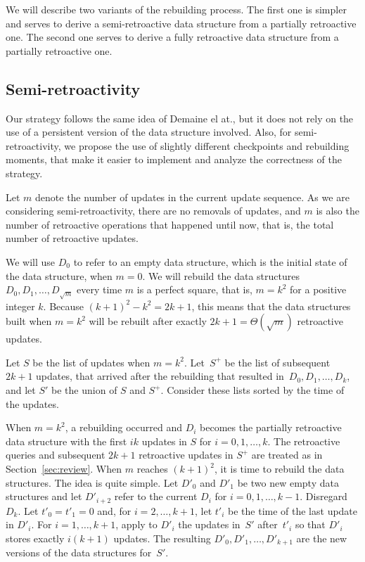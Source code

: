 \documentclass[reqno,11pt]{amsart}
\begin{document}
We will describe two variants of the rebuilding process. The first one is simpler
and serves to derive a semi-retroactive data structure from a partially retroactive 
one.  The second one serves to derive a fully retroactive data structure from a 
partially retroactive one. 

\subsection{Semi-retroactivity}\label{subsec:semi}

Our strategy follows the same idea of Demaine el at., but it does not 
rely on the use of a persistent version of the data structure involved. 
Also, for semi-retroactivity, we propose the use of slightly different 
checkpoints and rebuilding moments, that make it easier to implement 
and analyze the correctness of the strategy. 

Let $m$ denote the number of updates in the current update sequence. 
As we are considering semi-retroactivity, there are no removals of updates, 
and $m$ is also the number of retroactive operations that happened until now, 
that is, the total number of retroactive updates. 

We will use $D_0$ to refer to an empty data structure, 
which is the initial state of the data structure, when $m=0$. 
We will rebuild the data structures $D_0,D_1,\ldots,D_{\sqrt{m}}$ every 
time $m$ is a perfect square, that is, $m=k^2$ for a positive integer $k$.
Because $(k+1)^2-k^2 = 2k+1$, this means that the data structures built 
when $m=k^2$ will be rebuilt after exactly $2k+1=\Theta(\sqrt{m})$ retroactive updates.

Let $S$ be the list of updates when $m=k^2$. 
Let~$S^+$ be the list of subsequent $2k+1$ updates, 
that arrived after the rebuilding that resulted in~$D_0,D_1,\ldots,D_k$,
and let $S'$ be the union of $S$ and $S^+$.  
Consider these lists sorted by the time of the updates. 

When $m=k^2$, a rebuilding occurred and $D_i$ becomes the partially retroactive 
data structure with the first $ik$ updates in $S$ for $i=0,1,\ldots,k$. 
The retroactive queries and subsequent $2k+1$ retroactive updates in $S^+$ 
are treated as in Section~\ref{sec:review}. 
When $m$ reaches $(k+1)^2$, it is time to rebuild the data structures.  
The idea is quite simple.  Let $D'_0$ and $D'_1$ be two new empty data structures 
and let $D'_{i+2}$ refer to the current $D_i$ for $i=0,1,\ldots,k-1$.  Disregard $D_k$.   
Let $t'_0 = t'_1 = 0$ and, for $i=2,\ldots,k+1$, 
let $t'_i$ be the time of the last update in $D'_i$.
For $i=1,\ldots,k+1$, apply to $D'_i$ the updates in~$S'$ 
after~$t'_i$ so that $D'_i$ stores exactly $i(k+1)$ updates.
The resulting $D'_0,D'_1,\ldots,D'_{k+1}$ are the new versions of the data structures for~$S'$. 
\end{document}
